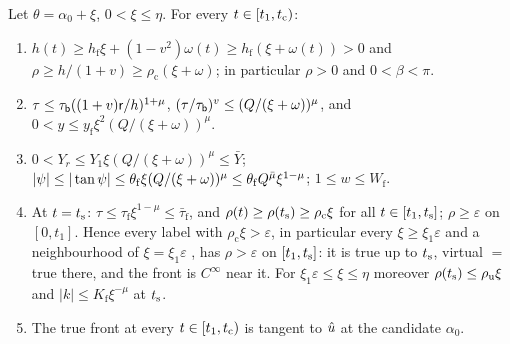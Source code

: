 \begin{lemma}\label{lem:HTp-fwd}
Let $\theta=\alpha_0+\xi$, $0<\xi\le\eta$. For every $t\in[t_1,t_{\mathrm c})$:
\begin{enumerate}
\item[(a)] $h(t)\ge h_{\mathrm f}\xi+(1-v^2)\omega(t)\ge h_{\mathrm f}(\xi+\omega(t))>0$ and $\rho\ge h/(1+v)\ge\rho_{\mathrm c}(\xi+\omega)$;
in particular $\rho>0$ and $0<\beta<\pi$.
\item[(b)] $\tau\le\tau_{\mathsf b}((1+v)\mathsf r/h)^{1+\mu}$, $(\tau/\tau_{\mathsf b})^v\le(Q/(\xi+\omega))^\mu$, and
$0<y\le y_{\mathrm f}\xi^2(Q/(\xi+\omega))^\mu$.
\item[(c)] $0<Y_r\le Y_1\xi(Q/(\xi+\omega))^\mu\le\bar Y$; $|\psi|\le|\tan\psi|\le\theta_{\mathrm f}\xi(Q/(\xi+\omega))^\mu\le
\theta_{\mathrm f}Q^{\bar\mu}\xi^{1-\mu}$; $1\le w\le W_{\mathrm f}$.
\item[(d)] At $t=t_{\mathrm s}$: $\tau\le\tau_{\mathrm f}\xi^{1-\mu}\le\bar\tau_{\mathrm f}$, and $\rho(t)\ge\rho(t_{\mathrm s})\ge\rho_{\mathrm c}\xi$ for all
$t\in[t_1,t_{\mathrm s}]$; $\rho\ge\varepsilon$ on $[0,t_1]$. Hence every label with $\rho_{\mathrm c}\xi>\varepsilon$, in particular every
$\xi\ge\xi_1\varepsilon$ and a neighbourhood of $\xi=\xi_1\varepsilon$ , has $\rho>\varepsilon$ on $[t_1,t_{\mathrm s}]$: it is true up to
$t_{\mathrm s}$, virtual $=$ true there, and the front is $C^\infty$ near it. For $\xi_1\varepsilon\le\xi\le\eta$ moreover
$\rho(t_{\mathrm s})\le\rho_{\mathrm u}\xi$ and $|k|\le K_{\mathrm f}\xi^{-\mu}$ at $t_{\mathrm s}$.
\item[(e)] The true front at every $t\in[t_1,t_{\mathrm c})$ is tangent to $\hat u$ at the candidate $\alpha_0$.
\end{enumerate}
\end{lemma}
